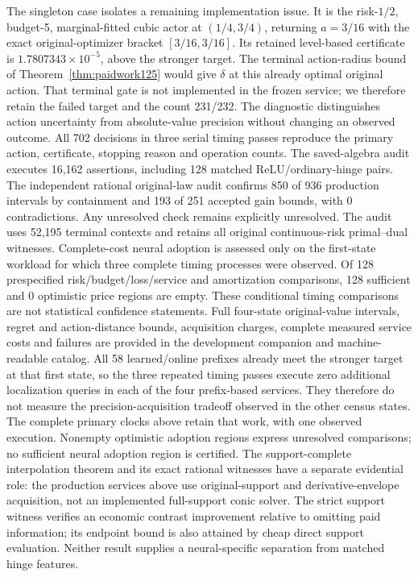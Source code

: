 The singleton case isolates a remaining implementation issue. It is the risk-$1/2$, budget-5, marginal-fitted cubic actor at $(1/4,3/4)$, returning $a=3/16$ with the exact original-optimizer bracket $[3/16,3/16]$. Its retained level-based certificate is $1.7807343\times10^{-5}$, above the stronger target. The terminal action-radius bound of Theorem~\ref{thm:paidwork125} would give $\delta$ at this already optimal original action. That terminal gate is not implemented in the frozen service; we therefore retain the failed target and the count 231/232. The diagnostic distinguishes action uncertainty from absolute-value precision without changing an observed outcome.
All 702 decisions in three serial timing passes reproduce the primary action, certificate, stopping reason and operation counts. The saved-algebra audit executes 16,162 assertions, including 128 matched ReLU/ordinary-hinge pairs. The independent rational original-law audit confirms 850 of 936 production intervals by containment and 193 of 251 accepted gain bounds, with 0 contradictions. Any unresolved check remains explicitly unresolved. The audit uses 52,195 terminal contexts and retains all original continuous-risk primal--dual witnesses.
Complete-cost neural adoption is assessed only on the first-state workload for which three complete timing processes were observed. Of 128 prespecified risk/budget/loss/service and amortization comparisons, 128 sufficient and 0 optimistic price regions are empty. These conditional timing comparisons are not statistical confidence statements. Full four-state original-value intervals, regret and action-distance bounds, acquisition charges, complete measured service costs and failures are provided in the development companion and machine-readable catalog.
All 58 learned/online prefixes already meet the stronger target at that first state, so the three repeated timing passes execute zero additional localization queries in each of the four prefix-based services. They therefore do not measure the precision-acquisition tradeoff observed in the other census states. The complete primary clocks above retain that work, with one observed execution. Nonempty optimistic adoption regions express unresolved comparisons; no sufficient neural adoption region is certified.
The support-complete interpolation theorem and its exact rational witnesses have a separate evidential role: the production services above use original-support and derivative-envelope acquisition, not an implemented full-support conic solver. The strict support witness verifies an economic contrast improvement relative to omitting paid information; its endpoint bound is also attained by cheap direct support evaluation. Neither result supplies a neural-specific separation from matched hinge features.
